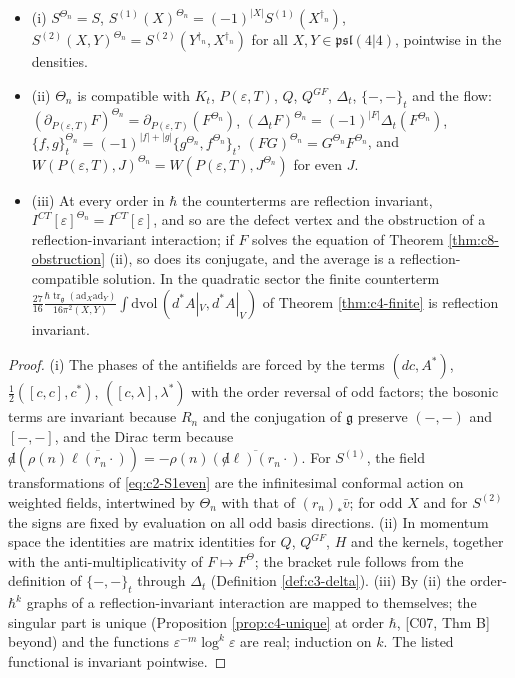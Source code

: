 \begin{theorem}
\label{thm:c8-fields}
\begin{itemize}
\item (i) $S^{\Theta_n}=S$, $S^{(1)}(X)^{\Theta_n}=(-1)^{|X|}S^{(1)}(X^{\dagger_n})$, $S^{(2)}(X,Y)^{\Theta_n}=S^{(2)}(Y^{\dagger_n},X^{\dagger_n})$ for all $X,Y\in\mathfrak{psl}(4|4)$, pointwise in the densities.
\item (ii) $\Theta_n$ is compatible with $K_t$, $P(\varepsilon,T)$, $Q$, $Q^{GF}$, $\Delta_t$, $\{-,-\}_t$ and the flow: $(\partial_{P(\varepsilon,T)}F)^{\Theta_n}=\partial_{P(\varepsilon,T)}(F^{\Theta_n})$, $(\Delta_tF)^{\Theta_n}=(-1)^{|F|}\Delta_t(F^{\Theta_n})$, $\{f,g\}_t^{\Theta_n}=(-1)^{|f|+|g|}\{g^{\Theta_n},f^{\Theta_n}\}_t$, $(FG)^{\Theta_n}=G^{\Theta_n}F^{\Theta_n}$, and $W(P(\varepsilon,T),J)^{\Theta_n}=W(P(\varepsilon,T),J^{\Theta_n})$ for even $J$.
\item (iii) At every order in $\hbar$ the counterterms are reflection invariant, $I^{CT}[\varepsilon]^{\Theta_n}=I^{CT}[\varepsilon]$, and so are the defect vertex and the obstruction of a reflection-invariant interaction; if $F$ solves the equation of Theorem \ref{thm:c8-obstruction} (ii), so does its conjugate, and the average is a reflection-compatible solution. In the quadratic sector the finite counterterm $\tfrac{27}{16}\frac{\hbar\operatorname{tr}_{\mathfrak g}(\mathrm{ad}_X\mathrm{ad}_Y)}{16\pi^2(X,Y)}\int\mathrm{dvol}\,(d^*A|_V,d^*A|_V)$ of Theorem \ref{thm:c4-finite} is reflection invariant.
\end{itemize}
\end{theorem}

\begin{proof}
(i) The phases of the antifields are forced by the terms $(dc,A^*)$, $\tfrac12([c,c],c^*)$, $([c,\lambda],\lambda^*)$ with the order reversal of odd factors; the bosonic terms are invariant because $R_n$ and the conjugation of $\mathfrak g$ preserve $(-,-)$ and $[-,-]$, and the Dirac term because ${\not d}(\rho(n)\overline{\ell(r_n\cdot)})=-\rho(n)\overline{({\not d}\ell)(r_n\cdot)}$. For $S^{(1)}$, the field transformations of \eqref{eq:c2-S1even} are the infinitesimal conformal action on weighted fields, intertwined by $\Theta_n$ with that of $(r_n)_*\bar v$; for odd $X$ and for $S^{(2)}$ the signs are fixed by evaluation on all odd basis directions. (ii) In momentum space the identities are matrix identities for $Q$, $Q^{GF}$, $H$ and the kernels, together with the anti-multiplicativity of $F\mapsto F^\Theta$; the bracket rule follows from the definition of $\{-,-\}_t$ through $\Delta_t$ (Definition \ref{def:c3-delta}). (iii) By (ii) the order-$\hbar^k$ graphs of a reflection-invariant interaction are mapped to themselves; the singular part is unique (Proposition \ref{prop:c4-unique} at order $\hbar$, [C07, Thm B] beyond) and the functions $\varepsilon^{-m}\log^k\varepsilon$ are real; induction on $k$. The listed functional is invariant pointwise.
\end{proof}

